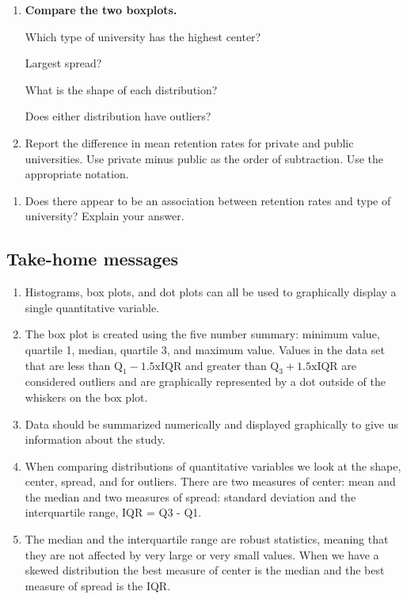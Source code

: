 \documentclass[
]{report}
\providecommand{\tightlist}{%
  \setlength{\itemsep}{0pt}\setlength{\parskip}{0pt}}
\begin{document}
\begin{enumerate}
\def\labelenumi{\arabic{enumi}.}
\setcounter{enumi}{14}
\item
  \textbf{Compare the two boxplots.}

  Which type of university has the highest center?
  \vspace{0.3in}

  Largest spread?
  \vspace{0.3in}

  What is the shape of each distribution?
  \vspace{0.3in}

  Does either distribution have outliers?
  \vspace{0.3in}
\item
  Report the difference in mean retention rates for private and public universities. Use private minus public as the order of subtraction. Use the appropriate notation.
\end{enumerate}

\vspace{0.8in}

\begin{enumerate}
\def\labelenumi{\arabic{enumi}.}
\setcounter{enumi}{16}
\tightlist
\item
  Does there appear to be an association between retention rates and type of university? Explain your answer.
\end{enumerate}

\newpage

\hypertarget{take-home-messages-5}{%
\subsection{Take-home messages}\label{take-home-messages-5}}

\begin{enumerate}
\def\labelenumi{\arabic{enumi}.}
\item
  Histograms, box plots, and dot plots can all be used to graphically display a single quantitative variable.
\item
  The box plot is created using the five number summary: minimum value, quartile 1, median, quartile 3, and maximum value. Values in the data set that are less than \(\text{Q}_1 - 1.5\text{xIQR}\) and greater than \(\text{Q}_3 + 1.5\text{xIQR}\) are considered outliers and are graphically represented by a dot outside of the whiskers on the box plot.
\item
  Data should be summarized numerically and displayed graphically to give us information about the study.
\item
  When comparing distributions of quantitative variables we look at the shape, center, spread, and for outliers. There are two measures of center: mean and the median and two measures of spread: standard deviation and the interquartile range, IQR = Q3 - Q1.
\item
  The median and the interquartile range are robust statistics, meaning that they are not affected by very large or very small values. When we have a skewed distribution the best measure of center is the median and the best measure of spread is the IQR.
\end{enumerate}
\end{document}
